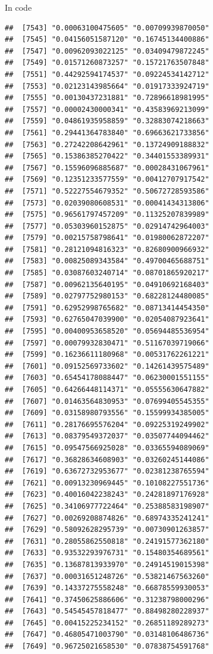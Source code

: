 \documentclass[ignorenonframetext,]{beamer}
\begin{document}
\begin{frame}[fragile]{In code}
\begin{verbatim}
##  [7543] "0.00063100475605" "0.00709939870050"
##  [7545] "0.04156051587120" "0.16745134400886"
##  [7547] "0.00962093022125" "0.03409479872245"
##  [7549] "0.01571260873257" "0.15721763507848"
##  [7551] "0.44292594174537" "0.09224534142712"
##  [7553] "0.02123143985664" "0.01917333924719"
##  [7555] "0.00130437231881" "0.72896618981995"
##  [7557] "0.00002430000341" "0.43583969213099"
##  [7559] "0.04861935958859" "0.32883074218663"
##  [7561] "0.29441364783840" "0.69663621733856"
##  [7563] "0.27242208642961" "0.13724909188832"
##  [7565] "0.15386385270422" "0.34401553389931"
##  [7567] "0.15596096885687" "0.00028431067961"
##  [7569] "0.12351233577559" "0.00412707917542"
##  [7571] "0.52227554679352" "0.50672728593586"
##  [7573] "0.02039080608531" "0.00041434313806"
##  [7575] "0.96561797457209" "0.11325207839989"
##  [7577] "0.05303960152875" "0.02914742964003"
##  [7579] "0.00215758798641" "0.01980062872207"
##  [7581] "0.28121094816323" "0.82680900966932"
##  [7583] "0.00825089343584" "0.49700465688751"
##  [7585] "0.03087603240714" "0.08701865920217"
##  [7587] "0.00962135640195" "0.04910692168403"
##  [7589] "0.02797752980153" "0.68228124480085"
##  [7591] "0.62952998765682" "0.08713414454350"
##  [7593] "0.62765047039900" "0.02054087923641"
##  [7595] "0.00400953658520" "0.05694485536954"
##  [7597] "0.00079932830471" "0.51167039719066"
##  [7599] "0.16236611180968" "0.00531762261221"
##  [7601] "0.09152569733602" "0.14261439575489"
##  [7603] "0.65454178088447" "0.06230001551155"
##  [7605] "0.64266448114371" "0.05555630647882"
##  [7607] "0.01463564830953" "0.07699405545355"
##  [7609] "0.03158980793556" "0.15599934385005"
##  [7611] "0.28176695576204" "0.09225319249902"
##  [7613] "0.08379549372037" "0.03507744094462"
##  [7615] "0.09547566925028" "0.03365594089069"
##  [7617] "0.36828634608903" "0.03260245144086"
##  [7619] "0.63672732953677" "0.02381238765594"
##  [7621] "0.00913230969445" "0.10108227551736"
##  [7623] "0.40016042238243" "0.24281897176928"
##  [7625] "0.34106977722464" "0.25388583198907"
##  [7627] "0.00269208874826" "0.68974335241241"
##  [7629] "0.58092628295739" "0.00730901263857"
##  [7631] "0.28055862550818" "0.24191577362180"
##  [7633] "0.93532293976731" "0.15480354689561"
##  [7635] "0.13687813933970" "0.24914519015398"
##  [7637] "0.00031651248726" "0.53821467563260"
##  [7639] "0.14337275558248" "0.66878559930053"
##  [7641] "0.37450625886606" "0.31238798000296"
##  [7643] "0.54545457818477" "0.88498280228937"
##  [7645] "0.00415225234152" "0.26851189289273"
##  [7647] "0.46805471003790" "0.03148106486736"
##  [7649] "0.96725021658530" "0.07838754591768"

\end{verbatim}
\end{frame}
\end{document}
